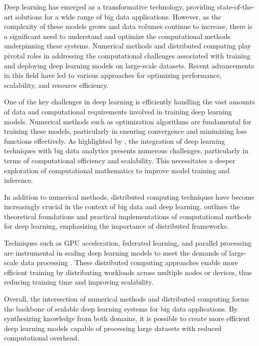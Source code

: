 \sloppy

Deep learning has emerged as a transformative technology, providing state-of-the-art solutions for a wide range of big data applications.
However, as the complexity of these models grows and data volumes continue to increase, there is a significant need to understand and optimize the computational methods underpinning these systems. Numerical methods and distributed computing play pivotal roles in addressing the computational challenges associated with training and deploying deep learning models on large-scale datasets. Recent advancements in this field have led to various approaches for optimizing performance, scalability, and resource efficiency.

One of the key challenges in deep learning is efficiently handling the vast amounts of data and computational requirements involved in training deep learning models.
Numerical methods such as optimization algorithms are fundamental for training these models, particularly in ensuring convergence and minimizing loss functions effectively.
As highlighted by \citet{najafabadi2015deep}, the integration of deep learning techniques with big data analytics presents numerous challenges, particularly in terms of computational efficiency and scalability. This necessitates a deeper exploration of computational mathematics to improve model training and inference.

In addition to numerical methods, distributed computing techniques have become increasingly crucial in the context of big data and deep learning. \citet{yan2023computational} outlines the theoretical foundations and practical implementations of computational methods for deep learning, emphasizing the importance of distributed frameworks.

Techniques such as GPU acceleration, federated learning, and parallel processing are instrumental in scaling deep learning models to meet the demands of large-scale data processing \citep{dehghani2023distributed}. These distributed computing approaches enable more efficient training by distributing workloads across multiple nodes or devices, thus reducing training time and improving scalability.

Overall, the intersection of numerical methods and distributed computing forms the backbone of scalable deep learning systems for big data applications.
By synthesizing knowledge from both domains, it is possible to create more efficient deep learning models capable of processing large datasets with reduced computational overhead.
